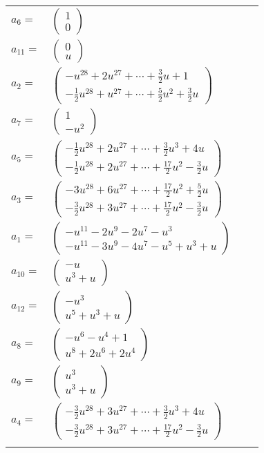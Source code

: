 \documentclass[1p]{elsarticle_modified}
\theoremstyle{definition}
\begin{document}
\begin{tabular}{m{7pt} m{180pt} m{7pt} m{180pt} }
\flushright $a_{6}=$&$\begin{pmatrix}1\\0\end{pmatrix}$ \\
\flushright $a_{11}=$&$\begin{pmatrix}0\\u\end{pmatrix}$ \\
\flushright $a_{2}=$&$\begin{pmatrix}- u^{28}+2 u^{27}+\cdots+\frac{3}{2} u+1\\-\frac{1}{2} u^{28}+u^{27}+\cdots+\frac{5}{2} u^2+\frac{3}{2} u\end{pmatrix}$ \\
\flushright $a_{7}=$&$\begin{pmatrix}1\\- u^2\end{pmatrix}$ \\
\flushright $a_{5}=$&$\begin{pmatrix}-\frac{1}{2} u^{28}+2 u^{27}+\cdots+\frac{3}{2} u^3+4 u\\-\frac{1}{2} u^{28}+2 u^{27}+\cdots+\frac{17}{2} u^2-\frac{3}{2} u\end{pmatrix}$ \\
\flushright $a_{3}=$&$\begin{pmatrix}-3 u^{28}+6 u^{27}+\cdots+\frac{17}{2} u^2+\frac{5}{2} u\\-\frac{3}{2} u^{28}+3 u^{27}+\cdots+\frac{17}{2} u^2-\frac{3}{2} u\end{pmatrix}$ \\
\flushright $a_{1}=$&$\begin{pmatrix}- u^{11}-2 u^9-2 u^7- u^3\\- u^{11}-3 u^9-4 u^7- u^5+u^3+u\end{pmatrix}$ \\
\flushright $a_{10}=$&$\begin{pmatrix}- u\\u^3+u\end{pmatrix}$ \\
\flushright $a_{12}=$&$\begin{pmatrix}- u^3\\u^5+u^3+u\end{pmatrix}$ \\
\flushright $a_{8}=$&$\begin{pmatrix}- u^6- u^4+1\\u^8+2 u^6+2 u^4\end{pmatrix}$ \\
\flushright $a_{9}=$&$\begin{pmatrix}u^3\\u^3+u\end{pmatrix}$ \\
\flushright $a_{4}=$&$\begin{pmatrix}-\frac{3}{2} u^{28}+3 u^{27}+\cdots+\frac{3}{2} u^3+4 u\\-\frac{3}{2} u^{28}+3 u^{27}+\cdots+\frac{17}{2} u^2-\frac{3}{2} u\end{pmatrix}$\\&\end{tabular}
\end{document}
